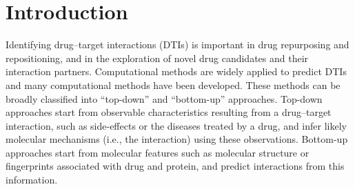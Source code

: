 \documentclass{bioinfo}
\begin{document}
\maketitle
\section{Introduction}



Identifying drug--target interactions (DTIs) is important in drug
repurposing and repositioning, and in the exploration of novel drug
candidates and their interaction partners. Computational methods are
widely applied to predict DTIs and many computational methods have
been developed.  These methods can be broadly classified into
``top-down'' and ``bottom-up'' approaches. Top-down approaches start
from observable characteristics resulting from a drug--target
interaction, such as side-effects or the diseases treated by a drug,
and infer likely molecular mechanisms (i.e., the interaction) using
these observations.
Bottom-up approaches start from molecular features such as molecular
structure or fingerprints associated with drug and protein, and
predict interactions from this information.
\end{document}
